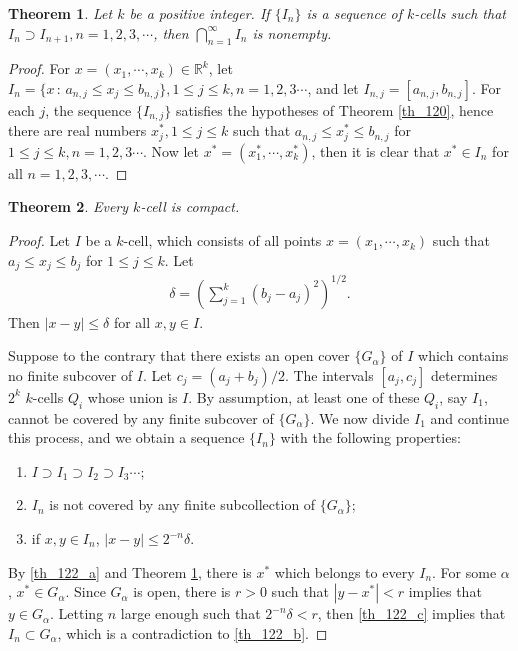 \documentclass[11pt]{book}
\newtheorem{theorem}{Theorem}[chapter]
\theoremstyle{definition}
\numberwithin{equation}{chapter}
\begin{document}
\begin{theorem}\label{th_121}
Let $k$ be a positive integer. If $\{I_n\}$ is a sequence of $k$-cells such that $I_n \supset I_{n+1}, n = 1,2,3,\cdots$, then $\bigcap^\infty_{n=1} I_n$ is nonempty.
\end{theorem}
\begin{proof}
For $x = (x_1, \cdots, x_k) \in \mathbb{R}^k$, let $I_n = \{x \,:\, a_{n,j} \leq x_j \leq b_{n,j}\}, 1 \leq j \leq k, n = 1,2,3\cdots$, and let $I_{n,j} = [a_{n,j}, b_{n,j}]$. For each $j$, the sequence $\{I_{n,j}\}$ satisfies the hypotheses of Theorem \ref{th_120}, hence there are real numbers $x_j^*, 1 \leq j \leq k$ such that $a_{n,j} \leq x_j^* \leq b_{n,j}$ for $1 \leq j \leq k, n = 1,2,3\cdots$. Now let $x^* = (x_1^*,\cdots, x_k^*)$, then it is clear that $x^* \in I_n$ for all $n = 1,2,3,\cdots$.
\end{proof}

\medskip

\begin{theorem}\label{th_122}
Every $k$-cell is compact.
\end{theorem}
\begin{proof}
Let $I$ be a $k$-cell, which consists of all points $x = (x_1, \cdots, x_k)$ such that $a_j \leq x_j \leq b_j$ for $1 \leq j \leq k$. Let
\begin{align*}
    \delta = \left(\sum^k_{j=1} (b_j - a_j)^2\right)^{1/2}.
\end{align*}
Then $\left|x - y\right| \leq \delta$ for all $x,y \in I$.

Suppose to the contrary that there exists an open cover $\{G_{\alpha}\}$ of $I$ which contains no finite subcover of $I$. Let $c_j = (a_j + b_j)/2$. The intervals $[a_j, c_j]$ determines $2^k$ $k$-cells $Q_i$ whose union is $I$. By assumption, at least one of these $Q_i$, say $I_1$, cannot be covered by any finite subcover of $\{G_{\alpha}\}$. We now divide $I_1$ and continue this process, and we obtain a sequence $\{I_n\}$ with the following properties:
\begin{enumerate}[label=(\alph*)]
    \item $I \supset I_1 \supset I_2 \supset I_3 \cdots$; \label{th_122_a}
    
    \item $I_n$ is not covered by any finite subcollection of $\{G_{\alpha}\}$; \label{th_122_b}
    
    \item if $x,y \in I_n$, $\left|x - y\right| \leq 2^{-n} \delta$. \label{th_122_c}
\end{enumerate}
By \ref{th_122_a} and Theorem \ref{th_121}, there is $x^*$ which belongs to every $I_n$. For some $\alpha$, $x^* \in G_{\alpha}$. Since $G_{\alpha}$ is open, there is $r > 0$ such that $\left|y - x^*\right| < r$ implies that $y \in G_{\alpha}$. Letting $n$ large enough such  that $2^{-n}\delta < r$, then \ref{th_122_c} implies that $I_n \subset G_{\alpha}$, which is a contradiction to \ref{th_122_b}.
\end{proof}
\end{document}
